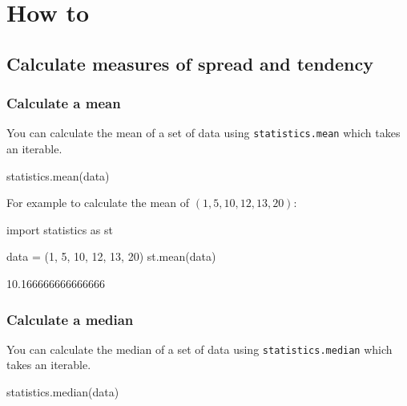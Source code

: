 \section{How to}
\label{\detokenize{tools-for-mathematics/08-statistics/how/main:how}}\label{\detokenize{tools-for-mathematics/08-statistics/how/main::doc}}

\subsection{Calculate measures of spread and tendency}
\label{\detokenize{tools-for-mathematics/08-statistics/how/main:calculate-measures-of-spread-and-tendency}}

\subsubsection{Calculate a mean}
\label{\detokenize{tools-for-mathematics/08-statistics/how/main:calculate-a-mean}}

You can calculate the mean of a set of data using \texttt{statistics.mean} which takes an
iterable.


\begin{api}
statistics.mean(data)
\end{api}



For example to calculate the mean of \((1, 5, 10, 12, 13, 20)\):




\begin{pyin}
import statistics as st

data = (1, 5, 10, 12, 13, 20)
st.mean(data)
\end{pyin}





\begin{raw}
10.166666666666666
\end{raw}





\subsubsection{Calculate a median}
\label{\detokenize{tools-for-mathematics/08-statistics/how/main:calculate-a-median}}

You can calculate the median of a set of data using \texttt{statistics.median} which takes an
iterable.


\begin{api}
statistics.median(data)
\end{api}




